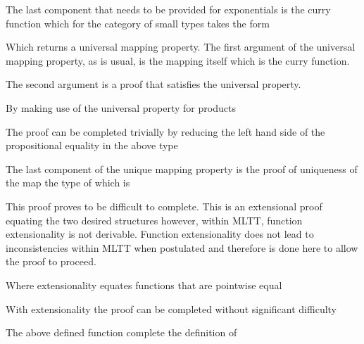 
The last component that needs to be provided for exponentials is the curry
function which for the category of small types takes the form


Which returns a universal mapping property. The first argument of the universal
mapping property, as is
usual, is the mapping itself which is the curry function.



The second argument is a proof that  satisfies the
universal property.


By making use of the universal property for products


The
proof can be completed trivially by reducing the left hand side of the propositional equality in the above type


The last component of the unique mapping property is the proof of uniqueness of
the map the type of which is


This proof proves to be difficult to complete.  This is an extensional proof equating the two desired structures
however, within MLTT, function extensionality is not derivable. Function extensionality
does not lead to inconsistencies within MLTT when postulated and therefore is
done here to allow the proof to proceed.


Where extensionality equates functions that are pointwise equal


With extensionality the proof can be completed without significant difficulty



The above defined function complete the definition of 

